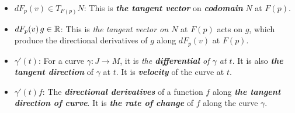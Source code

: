 \documentclass[11pt]{article}
\begin{document}
\begin{itemize}
\item $dF_p(v) \in T_{F(p)}N$: \quad This is \emph{\textbf{the tangent vector}} on \emph{\textbf{codomain}} $N$ at $F(p)$.

\item $dF_p(v)\,g \in {\mathbb R}$: \quad This is \emph{the tangent vector on $N$} at $F(p)$ acts on $g$, which produce the directional derivatives of $g$ along $dF_p(v)$ at $F(p)$.

\item $\gamma'(t)$: \quad For a curve $\gamma: J \rightarrow M$, it is \emph{the \textbf{differential} of $\gamma$ at $t$}. It is also \emph{\textbf{the tangent direction}} of $\gamma$ at $t$. It is \emph{\textbf{velocity}} of the curve at $t$.

\item $\gamma'(t)f$: \quad The \emph{\textbf{directional derivatives}} of a function $f$ along \emph{\textbf{the tangent direction of curve}}. It is \emph{\textbf{the rate of change}} of $f$ along the curve $\gamma$.
\end{itemize}
\end{document}
